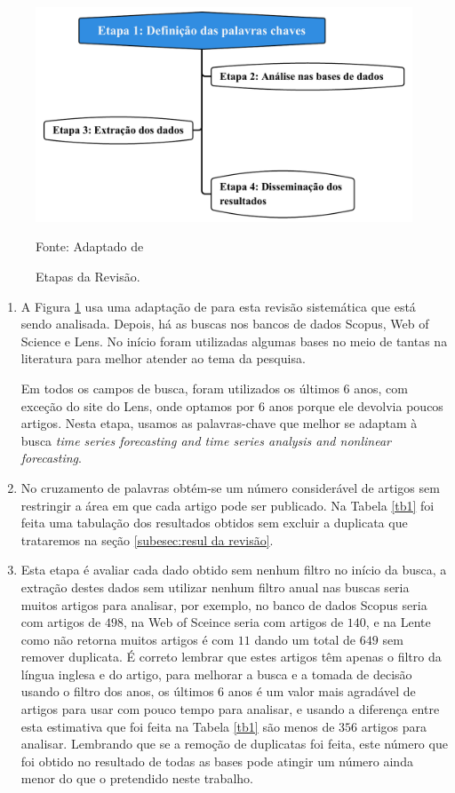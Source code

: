 \begin{figure}[H]
	\centering
	\caption{Etapas da Revisão.}
	\label{fig:rsl}
	\includegraphics[width=0.7\linewidth]{Revisao/Figuras/RSL}
	
	Fonte: Adaptado de 
\end{figure}
\begin{enumerate}[start=1, label = {\textbf{Etapa} \arabic* } ]
	
	
\item \label{etp:rev-1}A Figura \ref{fig:rsl} usa uma adaptação de  para esta revisão sistemática que está sendo analisada. Depois, há as buscas nos bancos de dados Scopus, Web of Science e Lens. No início foram utilizadas algumas bases no meio de tantas na literatura para melhor atender ao tema da pesquisa.



Em todos os campos de busca, foram utilizados os últimos 6 anos, com exceção do site do Lens, onde optamos por 6 anos porque ele devolvia poucos artigos. Nesta etapa, usamos as palavras-chave que melhor se adaptam à busca \textit{time series forecasting and time series analysis and nonlinear forecasting}.


\item \label{etp:rev-2} No cruzamento de palavras obtém-se um número considerável de artigos sem restringir a área em que cada artigo pode ser publicado. Na Tabela \ref{tb1} foi feita uma tabulação dos resultados obtidos sem excluir a duplicata que trataremos na seção \ref{subesec:resul da revisão}.

\item \label{etp:rev-3}Esta etapa é avaliar cada dado obtido sem nenhum filtro no início da busca, a extração destes dados sem utilizar nenhum filtro anual nas buscas seria muitos artigos para analisar, por exemplo, no banco de dados Scopus seria com artigos de $498$, na Web of Sceince seria com artigos de $140$, e na Lente como não retorna muitos artigos é com $11$ dando um total de $649$ sem remover duplicata. É correto lembrar que estes artigos têm apenas o filtro da língua inglesa e do artigo, para melhorar a busca e a tomada de decisão usando o filtro dos anos, os últimos 6 anos é um valor mais agradável de artigos para usar com pouco tempo para analisar, e usando a diferença entre esta estimativa que foi feita na Tabela \ref{tb1} são menos de $356$ artigos para analisar. Lembrando que se a remoção de duplicatas foi feita, este número que foi obtido no resultado de todas as bases pode atingir um número ainda menor do que o pretendido neste trabalho.


\end{enumerate}
